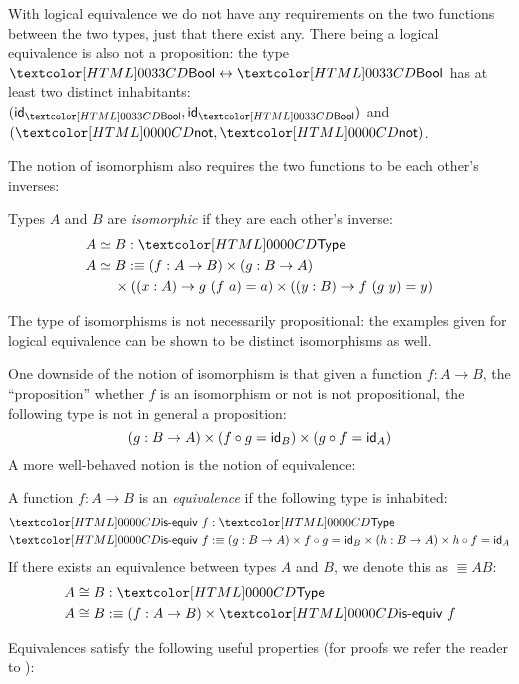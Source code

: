 With logical equivalence we do not have any requirements on the two
functions between the two types, just that there exist any. There
being a logical equivalence is also not a proposition: the type
$\boolty \logequiv \boolty$ has at least two distinct inhabitants:
$(\id_{\boolty} , \id_{\boolty})$ and $(\boolnot , \boolnot)$.

The notion of isomorphism also requires the two functions to be
each other's inverses:
\begin{definition}[Isomorphism]
  Types $A$ and $B$ are \emph{isomorphic} if they are each other's
  inverse:
  \begin{align*}
    &\Iso{A}{B} : \Type \\
    &\Iso{A}{B} \ddefeq (f : A \to B) \times (g : B \to A)  \\
    &\ \ \ \ \ \ \times ((x : A) \to g\ (f\ a) = a) \times ((y : B) \to f\ (g\ y) = y)
  \end{align*}
\end{definition}

The type of isomorphisms is not necessarily propositional: the
examples given for logical equivalence can be shown to be distinct
isomorphisms as well.

One downside of the notion of isomorphism is that given a function
$f : A \to B$, the ``proposition'' whether $f$ is an isomorphism or
not is not propositional, \ie the following type is not in general a
proposition:
$$
(g : B \to A) \times (f \circ g = \id_B) \times (g \circ f = \id_A)
$$
A more well-behaved notion is the notion of equivalence:
\begin{definition}[Equivalence]
  A function $f : A \to B$ is an \emph{equivalence} if the following
  type is inhabited:
  \begin{align*}
    &\isequiv\ f : \Type \\
    &\isequiv\ f \ddefeq (g : B \to A) \times f \circ g = \id_B \times (h : B \to A) \times h \circ f = \id_A
  \end{align*}
  If there exists an equivalence between types $A$ and $B$, we denote
  this as $\Equiv{A}{B}$:
  \begin{align*}
    &\Equiv{A}{B} : \Type \\
    &\Equiv{A}{B} \ddefeq (f : A \to B) \times \isequiv\ f
  \end{align*}
\end{definition}

Equivalences satisfy the following useful properties (for proofs we
refer the reader to \cite{UFP2013}):

